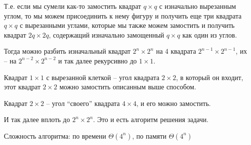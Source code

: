 \documentclass[12pt,a4paper]{article}
\begin{document}
    \bigskip

    Т.е. если мы сумели как-то замостить квадрат $q\times q$ с изначально вырезанным углом, то мы можем присоединить
    к нему фигуру и получить еще три квадрата $q\times q$ с вырезанными углами, которые мы также можем замостить
    и получить квадрат $2q\times 2q$, содержащий изначально замощенный $q\times q$ как один из углов.

    Тогда можно разбить изначальный квадрат $2^n\times 2^n$ на 4 квадрата $2^{n-1}\times 2^{n-1}$,
    их -- на $2^{n-2}\times 2^{n-2}$ и так далее рекурсивно до $1\times 1$.

    \bigskip

    \begin{center}
    \end{center}

    \bigskip

    Квадрат $1\times 1$ с вырезанной клеткой -- угол квадрата $2\times 2$, в который он входит,
    этот квадрат $2\times 2$ можно замостить описанным выше способом.

    Квадрат $2\times 2$ -- угол ``своего'' квадрата $4\times 4$, и его можно замостить.

    И так далее вплоть до $2^n\times 2^n$.
    Это и есть алгоритм решения задачи.

    Сложность алгоритма: по времени $\Theta(4^n)$, по памяти $\Theta(4^n)$
\end{document}

